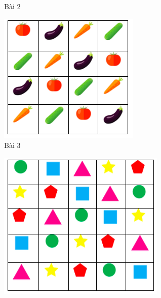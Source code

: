 \begin{multicols}{2}
\begin{figure}[H]
		\caption{\small{Bài $2$}}
		\vspace*{-10pt}
	\end{figure}
	\begin{figure}[H]
		\centering
		\vspace*{-5pt}
		\captionsetup{labelformat= empty, justification=centering}
		\includegraphics[width=0.9\linewidth]{sudoku3}
		\caption{\small{Bài $3$}}
		\vspace*{-10pt}
	\end{figure}
	\begin{figure}[H]
		\centering
		\vspace*{-5pt}
		\captionsetup{labelformat= empty, justification=centering}
		\includegraphics[width=0.9\linewidth]{sudoku4}

\end{figure}
\end{multicols}
